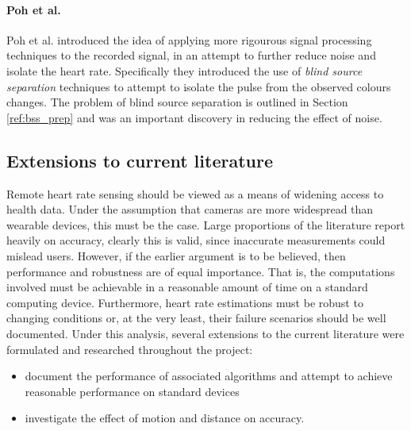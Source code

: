 \paragraph{Poh et al.}
Poh et al. \cite{poh2010non} introduced the idea of applying more rigourous signal processing techniques to the recorded signal, in an attempt to further reduce noise and isolate the heart rate.
Specifically they introduced the use of \textit{blind source separation} techniques to attempt to isolate the pulse from the observed colours changes. The problem of blind source separation is 
outlined in Section \ref{ref:bss_prep} and was an important discovery in reducing the effect of noise.


\subsection{Extensions to current literature}
Remote heart rate sensing should be viewed as a means of widening access to health data. Under the assumption that cameras are more widespread than wearable devices, this must be the case.
Large proportions of the literature report heavily on accuracy, clearly this is valid, since inaccurate measurements could mislead users. However, if the earlier argument is to be believed, then 
performance and robustness are of equal importance. That is, the computations involved must be achievable in a reasonable amount of time on a standard computing device. 
Furthermore, heart rate estimations must be robust to changing conditions or, at the very least, their failure scenarios should be well documented. 
Under this analysis, several extensions to the current literature were formulated and researched throughout the project:
\begin{itemize}
    \item document the performance of associated algorithms and attempt to achieve reasonable performance on standard devices
    \item investigate the effect of motion and distance on accuracy.
\end{itemize}


